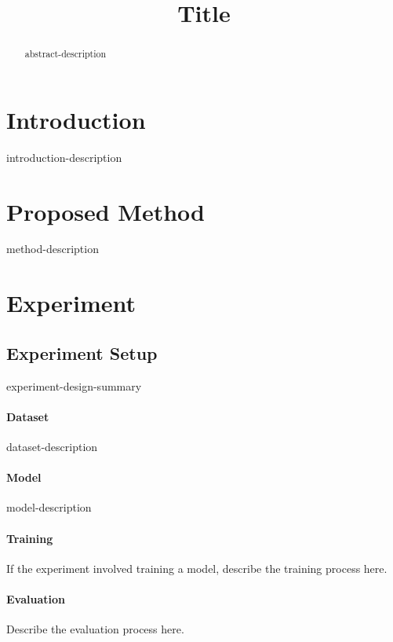 \documentclass{article}
\title{Title}
\begin{document}
\maketitle

\begin{abstract}
  {abstract-description}
\end{abstract}

\section{Introduction}
{introduction-description}

\section{Proposed Method}
{method-description}

\section{Experiment}

\subsection{Experiment Setup}
{experiment-design-summary}

\paragraph{Dataset}
{dataset-description}

\paragraph{Model}
{model-description}

\paragraph{Training}
If the experiment involved training a model, describe the training process here.

\paragraph{Evaluation}
Describe the evaluation process here.
\end{document}
